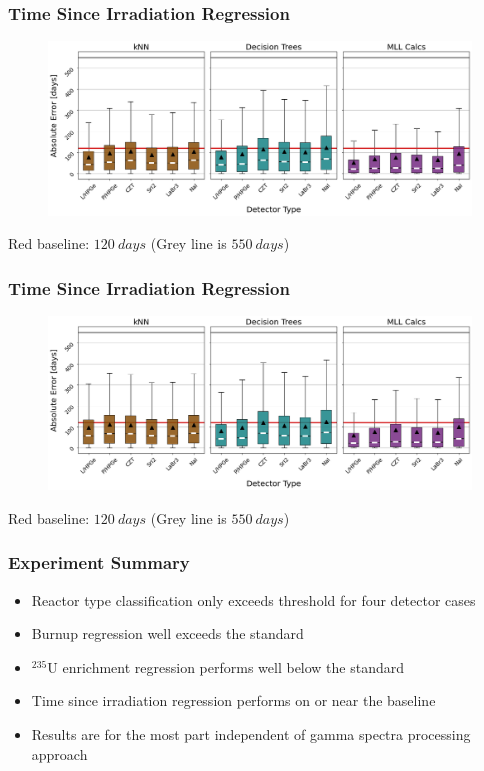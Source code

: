 \begin{frame}
  \frametitle{Time Since Irradiation Regression}
  \begin{adjustwidth}{-15pt}{-10pt}
  \begin{figure}
    \centering
    \includegraphics[width=1.1\textwidth]{./figures/abserror_boxplots_short_cool.png}
  \end{figure}
  \vspace{12pt} \centering Red baseline: $120\:days$ (Grey line is $550\:days$) 
  \end{adjustwidth}
\end{frame}

\begin{frame}
  \frametitle{Time Since Irradiation Regression}
  \begin{adjustwidth}{-15pt}{-10pt}
  \begin{figure}
    \centering
    \includegraphics[width=1.1\textwidth]{./figures/abserror_boxplots_long_cool.png}
  \end{figure}
  \vspace{12pt} \centering Red baseline: $120\:days$ (Grey line is $550\:days$) 
  \end{adjustwidth}
\end{frame}

\begin{frame}
  \frametitle{Experiment Summary}
  \begin{itemize}
    \item Reactor type classification only exceeds threshold for four detector
    cases
    \item Burnup regression well exceeds the standard
    \item ${}^{235}\text{U}$ enrichment regression performs well below the
    standard
    \item Time since irradiation regression performs on or near the baseline
    \item Results are for the most part independent of gamma spectra processing 
    approach
  \end{itemize}
\end{frame}

